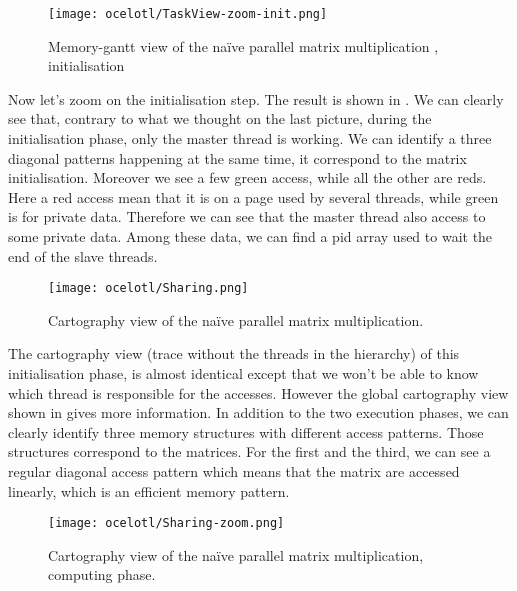\begin{figure}[htb]
    \centering
    \texttt{[image: ocelotl/TaskView-zoom-init.png]}
    \caption{Memory-gantt view of the naïve parallel matrix multiplication ,
    initialisation}
    \label{fig:ocelotl-th1}
\end{figure}

Now let's zoom on the initialisation step.
The result is shown in .
We can clearly see that, contrary to what we thought on the last picture, during the initialisation phase, only the master thread is working.
We can identify a three diagonal patterns happening at the same time, it correspond to the matrix initialisation.
Moreover we see a few green access, while all the other are reds.
Here a red access mean that it is on a page used by several threads, while green is for private data.
Therefore we can see that the master thread also access to some private data.
Among these data, we can find a pid array used to wait the end of the slave threads.

\begin{figure}[htb]
    \centering
    \texttt{[image: ocelotl/Sharing.png]}
    \caption{Cartography view of the naïve parallel matrix multiplication.}
    \label{fig:ocelotl-carto0}
\end{figure}

The cartography view (trace without the threads in the hierarchy) of this initialisation phase, is almost identical except that we won't be able to know which thread is responsible for the accesses.
However the global cartography view shown in  gives more information.
In addition to the two execution phases, we can clearly identify three memory structures with different access patterns.
Those structures correspond to the matrices.
For the first and the third, we can see a regular diagonal access pattern which means that the matrix are accessed linearly, which is an efficient memory pattern.

\begin{figure}[htb]
    \centering
    \texttt{[image: ocelotl/Sharing-zoom.png]}
    \caption{Cartography view of the naïve parallel matrix multiplication, computing phase.}
    \label{fig:ocelotl-Carto2}
\end{figure}

